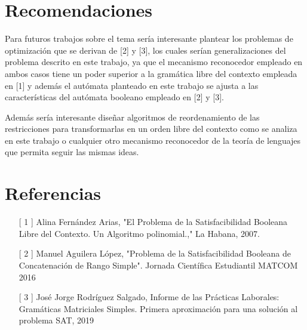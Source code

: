 \documentclass{article}
\begin{document}
\section*{Recomendaciones}

Para futuros trabajos sobre el tema sería interesante plantear los problemas de optimización que se derivan de [2] y [3], los cuales serían generalizaciones
del problema descrito en este trabajo, ya que el mecanismo reconocedor empleado en ambos casos tiene un poder superior a la gramática libre del contexto empleada
en [1] y además el autómata planteado en este trabajo se ajusta a las características del autómata booleano empleado en [2] y [3].

Además sería interesante diseñar algoritmos de reordenamiento de las restricciones para transformarlas en un orden libre del contexto como se analiza en este trabajo
o cualquier otro mecanismo reconocedor de la teoría de lenguajes que permita seguir las mismas ideas.

\section*{Referencias}


\begin{enumerate}
    \item[[ 1]] Alina Fernández Arias, "El Problema de la
    Satisfacibilidad Booleana Libre del Contexto.
    Un Algoritmo polinomial.," La Habana, 2007.
    \item[[ 2]] Manuel Aguilera López, "Problema de la Satisfacibilidad Booleana de Concatenación de Rango Simple". Jornada Científica Estudiantil MATCOM 2016
    \item[[ 3]] José Jorge Rodríguez Salgado, Informe de las Prácticas Laborales: Gramáticas Matriciales
    Simples. Primera aproximación para una solución al
    problema SAT, 2019    
\end{enumerate}
 
\end{document}
